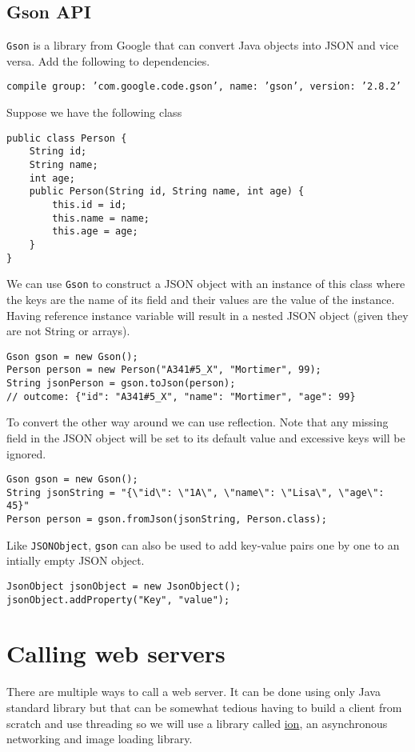 \subsection{Gson API}
\texttt{Gson} is a library from Google that can convert Java objects into JSON and vice versa. Add the following to dependencies.
\begin{center}\texttt{compile group: 'com.google.code.gson', name: 'gson', version: '2.8.2'}\end{center}
Suppose we have the following class
\begin{lstlisting}[style=A_Java]
public class Person {
	String id;
	String name;
	int age;
	public Person(String id, String name, int age) {
		this.id = id;
		this.name = name;
		this.age = age;
	}
}
\end{lstlisting}
We can use \texttt{Gson} to construct a JSON object with an instance of this class where the keys are the name of its field and their values are the value of the instance. Having reference instance variable will result in a nested JSON object (given they are not String or arrays).
\begin{lstlisting}[style=A_Java]
Gson gson = new Gson();
Person person = new Person("A341#5_X", "Mortimer", 99);
String jsonPerson = gson.toJson(person);
// outcome: {"id": "A341#5_X", "name": "Mortimer", "age": 99}
\end{lstlisting}
To convert the other way around we can use reflection. Note that any missing field in the JSON object will be set to its default value and excessive keys will be ignored.
\begin{lstlisting}[style=A_Java]
Gson gson = new Gson();
String jsonString = "{\"id\": \"1A\", \"name\": \"Lisa\", \"age\": 45}"
Person person = gson.fromJson(jsonString, Person.class);
\end{lstlisting}
Like \texttt{JSONObject}, \texttt{gson} can also be used to add key-value pairs one by one to an intially empty JSON object.
\begin{lstlisting}[style=A_Java]
JsonObject jsonObject = new JsonObject();
jsonObject.addProperty("Key", "value");
\end{lstlisting}

\section{Calling web servers}
There are multiple ways to call a web server. It can be done using only Java standard library but that can be somewhat tedious having to build a client from scratch and use threading so we will use a library called \href{https://github.com/koush/ion}{ion}, an asynchronous networking and image loading library.\\

